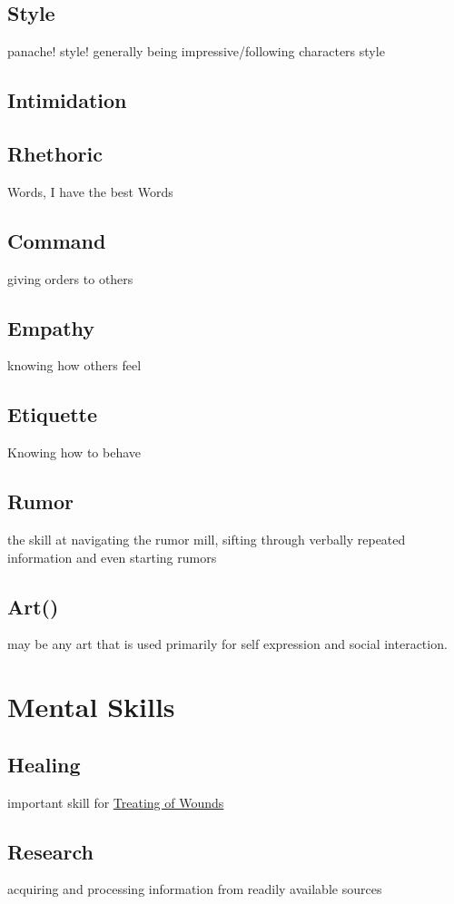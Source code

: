 \subsection{Style}\label{subsec:style}
panache!
style!
generally being impressive/following characters style
\subsection{Intimidation}\label{subsec:intimidation}
\subsection{Rhethoric}\label{subsec:rhethoric}
Words, I have the best Words
\subsection{Command}\label{subsec:command}
giving orders to others
\subsection{Empathy}\label{subsec:empathy}
knowing how others feel
\subsection{Etiquette}\label{subsec:etiquette}
Knowing how to behave
\subsection{Rumor}\label{subsec:rumor}
the skill at navigating the rumor mill, sifting through verbally repeated information and even starting rumors
\subsection{Art()}\label{subsec:art}
may be any art that is used primarily for self expression and social interaction.

\section{Mental Skills}\label{sec:wisdom-skills}
\subsection{Healing}\label{subsec:healing-skill}
important skill for \hyperref[subsec:treatment]{Treating of Wounds}
\subsection{Research}\label{subsec:research}
acquiring and processing information from readily available sources

